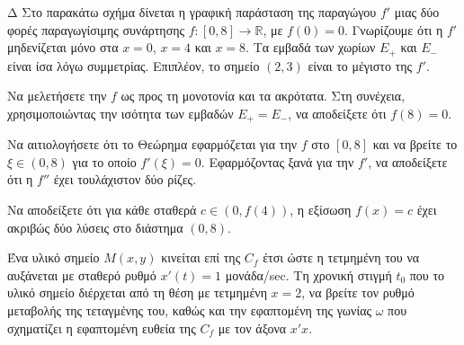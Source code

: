 
\begin{thema}{Δ}
Στο παρακάτω σχήμα δίνεται η γραφική παράσταση της παραγώγου $f'$ μιας δύο φορές παραγωγίσιμης συνάρτησης $f:[0, 8]\to\mathbb{R}$, με $f(0) = 0$. Γνωρίζουμε ότι η $f'$ μηδενίζεται μόνο στα $x=0$, $x=4$ και $x=8$. Τα εμβαδά των χωρίων $E_+$ και $E_-$ είναι ίσα λόγω συμμετρίας. Επιπλέον, το σημείο $(2,3)$ είναι το μέγιστο της $f'$.

\begin{center}
\end{center}

\begin{erwthma}
  \item Να μελετήσετε την $f$ ως προς τη μονοτονία και τα ακρότατα. Στη συνέχεια, χρησιμοποιώντας την ισότητα των εμβαδών $E_+ = E_-$, να αποδείξετε ότι $f(8) = 0$.
  \item Να αιτιολογήσετε ότι το Θεώρημα  εφαρμόζεται για την $f$ στο $[0, 8]$ και να βρείτε το $\xi \in (0, 8)$ για το οποίο $f'(\xi) = 0$. Εφαρμόζοντας ξανά  για την $f'$, να αποδείξετε ότι η $f''$ έχει τουλάχιστον δύο ρίζες.
  \item Να αποδείξετε ότι για κάθε σταθερά $c \in (0, f(4))$, η εξίσωση $f(x) = c$ έχει ακριβώς δύο λύσεις στο διάστημα $(0, 8)$.
  \item Ένα υλικό σημείο $M(x, y)$ κινείται επί της $C_f$ έτσι ώστε η τετμημένη του να αυξάνεται με σταθερό ρυθμό $x'(t) = 1$ μονάδα/sec. Τη χρονική στιγμή $t_0$ που το υλικό σημείο διέρχεται από τη θέση με τετμημένη $x = 2$, να βρείτε τον ρυθμό μεταβολής της τεταγμένης του, καθώς και την εφαπτομένη της γωνίας $\omega$ που σχηματίζει η εφαπτομένη ευθεία της $C_f$ με τον άξονα $x'x$.
\end{erwthma}
\end{thema}

